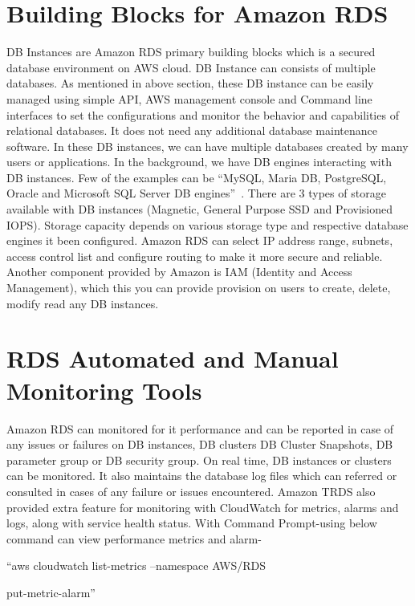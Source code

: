 \section{Building Blocks for Amazon RDS}

DB Instances are Amazon RDS primary building blocks which is a secured 
database environment on AWS cloud. DB Instance can consists of multiple databases. 
As mentioned in above section, these DB instance can 
be easily managed using simple API, AWS management console and Command line 
interfaces to set the configurations and monitor the behavior and capabilities 
of relational databases. It does not need any additional database maintenance 
software. In these DB instances, we can have multiple databases created by many 
users or 
applications.
In the background, we have DB engines interacting with DB instances. Few of the 
examples can be ``MySQL, Maria DB, PostgreSQL, Oracle and Microsoft SQL Server DB 
engines''~\cite{hid-sp18-520-amazonrds}.
There are 3 types of storage available with DB instances (Magnetic, General 
Purpose SSD and Provisioned IOPS).
Storage capacity depends on various storage type and respective database engines 
it been configured.
Amazon RDS can select IP address range, subnets, access control list and 
configure routing to make it more secure and reliable.
Another component provided by Amazon is IAM (Identity and Access Management), 
which this you can provide provision on users to create, delete, modify read 
any DB instances.

\section{RDS Automated and Manual Monitoring Tools}

Amazon RDS can monitored for it performance and can be reported in case of 
any issues or failures on DB instances, DB clusters DB Cluster Snapshots, DB 
parameter group or DB security group.
On real time, DB instances or clusters can be monitored. It also maintains the 
database log files which can referred or consulted in cases of any failure or 
issues encountered.  
Amazon TRDS also provided extra feature for monitoring with CloudWatch for 
metrics, alarms and logs, along with service health status. 
With Command Prompt-using below command can view performance metrics and 
alarm- 

``aws cloudwatch list-metrics --namespace AWS/RDS

put-metric-alarm''~\cite{hid-sp18-520-amardsmon}

